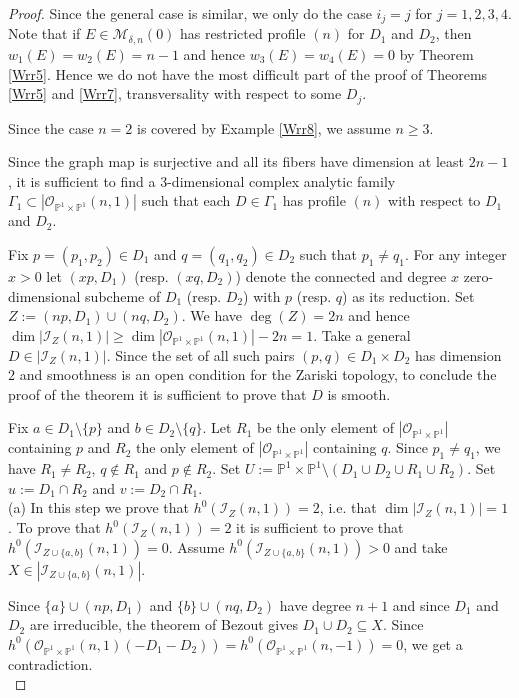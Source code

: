 \documentclass[
  a4paper, 
  reqno, 
  oneside, 
  11pt
]{amsart}
\theoremstyle{plain}	%
\theoremstyle{mydef} %
\theoremstyle{remark}
\theoremstyle{definition}
\theoremstyle{remark}
\begin{document}
\begin{proof}
Since the general case is similar, we only do the case $i_j=j$ for $j=1,2,3,4$.
Note that if $E\in \mathcal M _{\delta,n}(0)$ has restricted profile $(n)$ for $D_1$ and $D_2$, then $w_1(E)=w_2(E)=n-1$ and hence $w_3(E)=w_4(E)=0$ by Theorem \ref{Wrr5}. Hence we do not have the most difficult part of the proof of Theorems \ref{Wrr5} and \ref{Wrr7}, transversality with respect  to some $D_j$.


Since the case $n=2$ is covered by Example \ref{Wrr8}, we assume $n\ge 3$. 


Since the graph map is surjective and all its fibers have dimension at least $2n-1$, it is sufficient to find a $3$-dimensional complex analytic family $\Gamma_1\subset  |\mathcal O_{\mathbb P^1\times \mathbb P^1}(n,1)|$ such that each $D\in \Gamma_1$ has profile $(n)$ with respect to $D_1$ and $D_2$.

Fix $p=(p_1,p_2)\in D_1$ and $q=(q_1,q_2)\in D_2$ such that $p_1\ne q_1$. For any integer $x>0$ let $(xp,D_1)$ (resp. $(xq,D_2)$) denote the connected and degree $x$ zero-dimensional subcheme
of $D_1$ (resp. $D_2$) with $p$ (resp. $q$) as its reduction. Set $Z:= (np,D_1)\cup (nq,D_2)$. We have $\deg(Z) =2n$ and hence $\dim |\mathcal I_Z(n,1)| \ge \dim |\mathcal O_{\mathbb P^1\times \mathbb P^1}(n,1)|-2n=1$.
Take a general $D\in |\mathcal I_Z(n,1)|$. Since the set of all such pairs $(p,q)\in D_1\times D_2$ has dimension $2$ and smoothness is an open condition for the Zariski topology, to conclude the proof of the theorem it is sufficient to prove that $D$ is smooth.

 Fix $a\in D_1\setminus \{p\}$ and $b\in D_2\setminus \{q\}$. Let $R_1$ be the only element of $|\mathcal O_{\mathbb P^1\times \mathbb P^1}|$ containing $p$
 and $R_2$ the only element of $|\mathcal O_{\mathbb P^1\times \mathbb P^1}|$ containing $q$. Since $p_1\ne q_1$, we have $R_1\ne R_2$, $q\notin R_1$ and $p\notin R_2$. Set $U:= \mathbb P^1\times \mathbb P^1\setminus (D_1\cup D_2\cup R_1\cup R_2)$. Set $u:= D_1\cap R_2$ and $v:= D_2\cap R_1$.\\

{(a)} In this step we prove that $h^0(\mathcal I_Z(n,1))=2$, i.e. that $\dim |\mathcal I_Z(n,1)|=1$.
To prove that $h^0(\mathcal I_Z(n,1))=2$ it is sufficient to prove that $h^0(\mathcal I_{Z\cup \{a,b\}}(n,1))=0$. Assume $h^0(\mathcal I_{Z\cup \{a,b\}}(n,1))>0$ and take $X\in |\mathcal I_{Z\cup \{a,b\}}(n,1)|$. 

Since $\{a\}\cup (np,D_1)$ and $\{b\}\cup (nq,D_2)$ have degree $n+1$ and since $D_1$ and $D_2$ are irreducible, the theorem of Bezout gives
$D_1\cup D_2\subseteq X$. Since $h^0(\mathcal O_{\mathbb P^1\times \mathbb P^1}(n,1)(-D_1-D_2)) =h^0(\mathcal O_{\mathbb P^1\times \mathbb P^1}(n,-1))=0$, we get a contradiction.\\


\end{proof}
\end{document}
